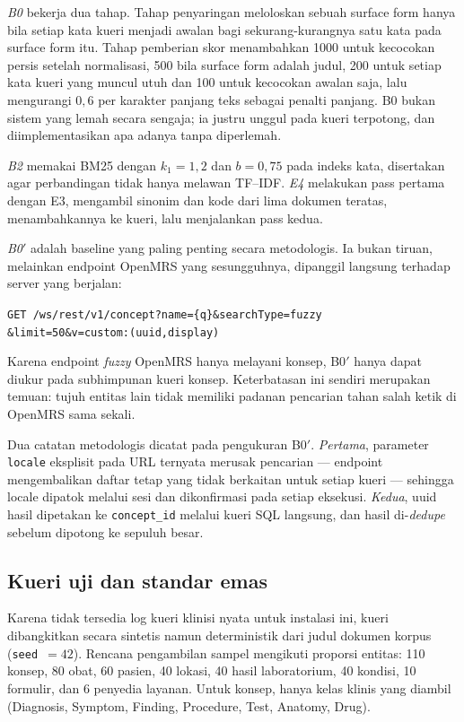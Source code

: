 \documentclass[journal,twoside,web]{ieeecolor}
\begin{document}
\emph{B0} bekerja dua tahap. Tahap penyaringan meloloskan sebuah surface form
hanya bila setiap kata kueri menjadi awalan bagi sekurang-kurangnya satu kata
pada surface form itu. Tahap pemberian skor menambahkan 1000 untuk kecocokan
persis setelah normalisasi, 500 bila surface form adalah judul, 200 untuk setiap
kata kueri yang muncul utuh dan 100 untuk kecocokan awalan saja, lalu mengurangi
$0{,}6$ per karakter panjang teks sebagai penalti panjang. B0 bukan sistem yang
lemah secara sengaja; ia justru unggul pada kueri terpotong, dan
diimplementasikan apa adanya tanpa diperlemah.

\emph{B2} memakai BM25 \cite{robertson2009} dengan $k_1 = 1{,}2$ dan $b = 0{,}75$
pada indeks kata, disertakan agar perbandingan tidak hanya melawan TF--IDF.
\emph{E4} melakukan pass pertama dengan E3, mengambil sinonim dan kode dari lima
dokumen teratas, menambahkannya ke kueri, lalu menjalankan pass kedua.

\emph{B0$'$} adalah baseline yang paling penting secara metodologis. Ia bukan
tiruan, melainkan endpoint OpenMRS yang sesungguhnya, dipanggil langsung terhadap
server yang berjalan:
\begin{center}
\texttt{\footnotesize GET /ws/rest/v1/concept?name=\{q\}\&searchType=fuzzy}\\
\texttt{\footnotesize \&limit=50\&v=custom:(uuid,display)}
\end{center}
Karena endpoint \emph{fuzzy} OpenMRS hanya melayani konsep, B0$'$ hanya dapat
diukur pada subhimpunan kueri konsep. Keterbatasan ini sendiri merupakan temuan:
tujuh entitas lain tidak memiliki padanan pencarian tahan salah ketik di OpenMRS
sama sekali.

Dua catatan metodologis dicatat pada pengukuran B0$'$. \emph{Pertama}, parameter
\texttt{locale} eksplisit pada URL ternyata merusak pencarian --- endpoint
mengembalikan daftar tetap yang tidak berkaitan untuk setiap kueri --- sehingga
locale dipatok melalui sesi dan dikonfirmasi pada setiap eksekusi.
\emph{Kedua}, uuid hasil dipetakan ke \texttt{concept\_id} melalui kueri SQL
langsung, dan hasil di-\emph{dedupe} sebelum dipotong ke sepuluh besar.

\subsection{Kueri uji dan standar emas}

Karena tidak tersedia log kueri klinisi nyata untuk instalasi ini, kueri
dibangkitkan secara sintetis namun deterministik dari judul dokumen korpus
(\texttt{seed}~$=42$). Rencana pengambilan sampel mengikuti proporsi entitas:
110 konsep, 80 obat, 60 pasien, 40 lokasi, 40 hasil laboratorium, 40 kondisi,
10 formulir, dan 6 penyedia layanan. Untuk konsep, hanya kelas klinis yang
diambil (Diagnosis, Symptom, Finding, Procedure, Test, Anatomy, Drug).
\end{document}
